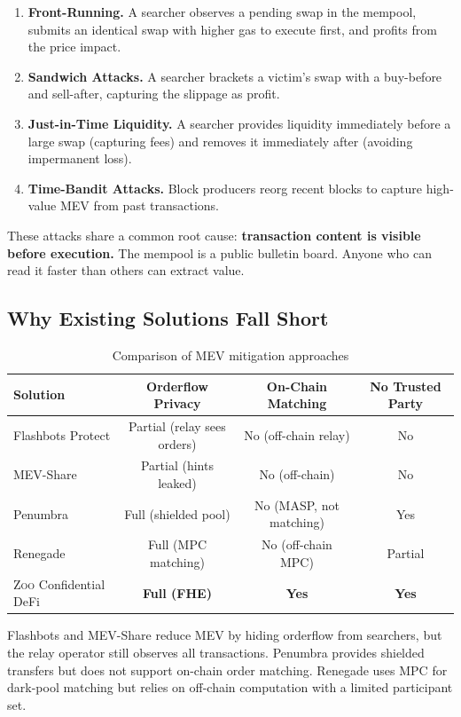 \documentclass[11pt,letterpaper]{article}
\theoremstyle{definition}
\theoremstyle{remark}
\newcommand{\Zoo}{\textsc{Zoo}}
\newcommand{\MEV}{\textsc{MEV}}
\begin{document}
\begin{enumerate}
    \item \textbf{Front-Running.} A searcher observes a pending swap in the mempool, submits an identical swap with higher gas to execute first, and profits from the price impact.
    \item \textbf{Sandwich Attacks.} A searcher brackets a victim's swap with a buy-before and sell-after, capturing the slippage as profit.
    \item \textbf{Just-in-Time Liquidity.} A searcher provides liquidity immediately before a large swap (capturing fees) and removes it immediately after (avoiding impermanent loss).
    \item \textbf{Time-Bandit Attacks.} Block producers reorg recent blocks to capture high-value \MEV{} from past transactions.
\end{enumerate}

These attacks share a common root cause: \textbf{transaction content is visible before execution.} The mempool is a public bulletin board. Anyone who can read it faster than others can extract value.

\subsection{Why Existing Solutions Fall Short}

\begin{table}[h]
\centering
\begin{tabular}{lccc}
\toprule
\textbf{Solution} & \textbf{Orderflow Privacy} & \textbf{On-Chain Matching} & \textbf{No Trusted Party} \\
\midrule
Flashbots Protect & Partial (relay sees orders) & No (off-chain relay) & No \\
MEV-Share & Partial (hints leaked) & No (off-chain) & No \\
Penumbra & Full (shielded pool) & No (MASP, not matching) & Yes \\
Renegade & Full (MPC matching) & No (off-chain MPC) & Partial \\
\Zoo{} Confidential DeFi & \textbf{Full (FHE)} & \textbf{Yes} & \textbf{Yes} \\
\bottomrule
\end{tabular}
\caption{Comparison of \MEV{} mitigation approaches}
\label{tab:mev_comparison}
\end{table}

Flashbots and MEV-Share reduce \MEV{} by hiding orderflow from searchers, but the relay operator still observes all transactions. Penumbra provides shielded transfers but does not support on-chain order matching. Renegade uses MPC for dark-pool matching but relies on off-chain computation with a limited participant set.
\end{document}
